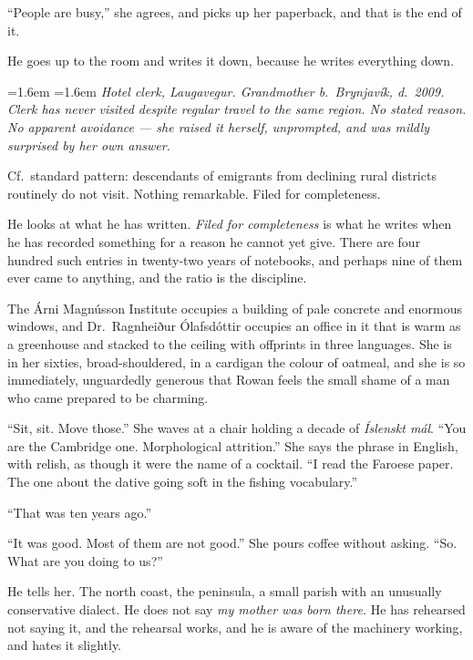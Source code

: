 \documentclass[11pt,oneside]{book}
\newcommand{\sceneline}{%
  \par\vspace{1.2em}
  \begin{center}
    \fontsize{11}{11}\selectfont \textbullet\quad\textbullet\quad\textbullet
  \end{center}
  \vspace{0.6em}\noindent\ignorespaces
}
\newenvironment{fieldnote}
  {\par\vspace{0.9em}\begingroup
   \leftskip=1.6em \rightskip=1.6em
   \fontsize{10}{12.4}\selectfont\itshape
   \setlength{\parindent}{0pt}\noindent\ignorespaces}
  {\par\endgroup\vspace{0.9em}\noindent\ignorespaces}
\begin{document}
``People are busy,'' she agrees, and picks up her paperback, and that
is the end of it.

He goes up to the room and writes it down, because he writes everything
down.

\begin{fieldnote}
Hotel clerk, Laugavegur. Grandmother b.\ Brynjavík, d.\ 2009. Clerk has
never visited despite regular travel to the same region. No stated
reason. No apparent avoidance --- she raised it herself, unprompted, and
was mildly surprised by her own answer.

Cf.\ standard pattern: descendants of emigrants from declining rural
districts routinely do not visit. Nothing remarkable. Filed for
completeness.
\end{fieldnote}

He looks at what he has written. \emph{Filed for completeness} is what
he writes when he has recorded something for a reason he cannot yet
give. There are four hundred such entries in twenty-two years of
notebooks, and perhaps nine of them ever came to anything, and the ratio
is the discipline.

\sceneline

The Árni Magnússon Institute occupies a building of pale concrete and
enormous windows, and Dr.~Ragnheiður Ólafsdóttir occupies an office in
it that is warm as a greenhouse and stacked to the ceiling with offprints
in three languages. She is in her sixties, broad-shouldered, in a
cardigan the colour of oatmeal, and she is so immediately, unguardedly
generous that Rowan feels the small shame of a man who came prepared to
be charming.

``Sit, sit. Move those.'' She waves at a chair holding a decade of
\emph{Íslenskt mál}. ``You are the Cambridge one. Morphological
attrition.'' She says the phrase in English, with relish, as though it
were the name of a cocktail. ``I read the Faroese paper. The one about
the dative going soft in the fishing vocabulary.''

``That was ten years ago.''

``It was good. Most of them are not good.'' She pours coffee without
asking. ``So. What are you doing to us?''

He tells her. The north coast, the peninsula, a small parish with an
unusually conservative dialect. He does not say \emph{my mother was born
there.} He has rehearsed not saying it, and the rehearsal works, and he
is aware of the machinery working, and hates it slightly.
\end{document}
